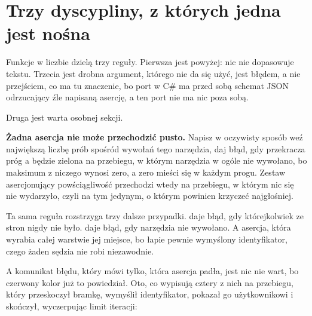 \section{Trzy dyscypliny, z których jedna jest nośna}
\label{sec:ch14-disciplines}

Funkcje w liczbie  dzielą trzy reguły. Pierwsza jest
powyżej: nic nie dopasowuje tekstu. Trzecia jest drobna \dash{} argument,
którego nie da się użyć, jest błędem, a nie przejściem, co ma tu znaczenie,
bo port w C\# ma przed sobą schemat JSON odrzucający źle napisaną asercję,
a ten port nie ma nic poza sobą.

Druga jest warta osobnej sekcji.

\begin{trapbox}
\textbf{Żadna asercja nie może przechodzić pusto.} Napisz
 w oczywisty sposób \dash{} weź największą liczbę prób
spośród wywołań tego narzędzia, daj błąd, gdy przekracza próg \dash{} a
będzie zielona na przebiegu, w którym narzędzia w ogóle nie wywołano, bo
maksimum z niczego wynosi zero, a zero mieści się w każdym progu. Zestaw
asercjonujący powściągliwość przechodzi wtedy na przebiegu, w którym nic
się nie wydarzyło, czyli na tym jedynym, o którym powinien krzyczeć
najgłośniej.
\end{trapbox}


\noindent
Ta sama reguła rozstrzyga trzy dalsze przypadki.
 daje błąd, gdy którejkolwiek ze stron nigdy nie było.
 daje błąd, gdy narzędzia nie wywołano. A
 \dash{} asercja, która wyrabia całej warstwie
jej miejsce, bo łapie pewnie wymyślony identyfikator, czego żaden sędzia
nie robi niezawodnie.


\noindent
A komunikat błędu, który mówi tylko, która asercja padła, jest nic nie
wart, bo czerwony kolor już to powiedział. Oto, co wypisują cztery z nich
na przebiegu, który przeskoczył bramkę, wymyślił identyfikator, pokazał go
użytkownikowi i skończył, wyczerpując limit iteracji:


